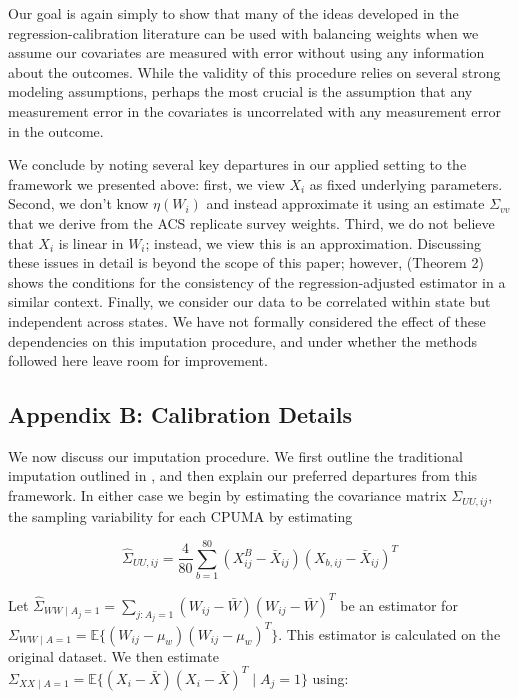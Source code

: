 \documentclass[12pt]{article}
\begin{document}
Our goal is again simply to show that many of the ideas developed in the regression-calibration literature can be used with balancing weights when we assume our covariates are measured with error without using any information about the outcomes. While the validity of this procedure relies on several strong modeling assumptions, perhaps the most crucial is the assumption that any measurement error in the covariates is uncorrelated with any measurement error in the outcome. 

We conclude by noting several key departures in our applied setting to the framework we presented above: first, we view $X_i$ as fixed underlying parameters. Second, we don't know $\eta(W_i)$ and instead approximate it using an estimate $\Sigma_{vv}$ that we derive from the ACS replicate survey weights. Third, we do not believe that $X_i$ is linear in $W_i$; instead, we view this is an approximation. Discussing these issues in detail is beyond the scope of this paper; however, \cite{gleser1992importance} (Theorem 2) shows the conditions for the consistency of the regression-adjusted estimator in a similar context. Finally, we consider our data to be correlated within state but independent across states. We have not formally considered the effect of these dependencies on this imputation procedure, and under whether the methods followed here leave room for improvement. 

\subsection{Appendix B: Calibration Details}

We now discuss our imputation procedure. We first outline the traditional imputation outlined in \cite{carroll2006measurement}, and then explain our preferred departures from this framework. In either case we begin by estimating the covariance matrix $\Sigma_{UU, ij}$, the sampling variability for each CPUMA by estimating

$$
\hat{\Sigma}_{UU, ij} = \frac{4}{80}\sum_{b=1}^{80}(X_{ij}^B - \bar{X}_{ij})(X_{b, ij} - \bar{X}_{ij})^T
$$

Let $\hat{\Sigma}_{WW \mid A_j = 1} = \sum_{j: A_j = 1} (W_{ij} - \bar{W})(W_{ij} - \bar{W})^T$ be an estimator for $\Sigma_{WW \mid A = 1} = \mathbb{E}\{(W_{ij} - \mu_w)(W_{ij} - \mu_w)^T\}$. This estimator is calculated on the original dataset. We then estimate $\Sigma_{XX \mid A = 1} = \mathbb{E}\{(X_i - \bar{X})(X_i - \bar{X})^T \mid A_j = 1\}$ using:
\end{document}
